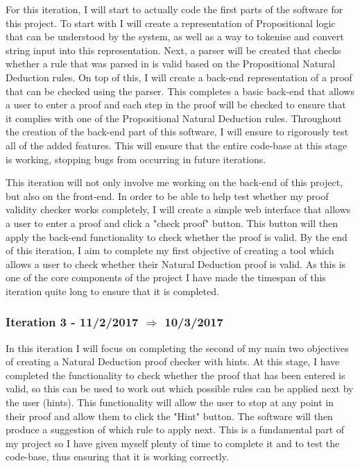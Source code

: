 For this iteration, I will start to actually code the first parts of the software for this project. To start with I will create a representation of Propositional logic that can be understood by the system, as well as a way to tokenise and convert string input into this representation. Next, a parser will be created that checks whether a rule that was parsed in is valid based on the Propositional Natural Deduction rules. On top of this, I will create a back-end representation of a proof that can be checked using the parser. This completes a basic back-end that allows a user to enter a proof and each step in the proof will be checked to ensure that it complies with one of the Propositional Natural Deduction rules. Throughout the creation of the back-end part of this software, I will ensure to rigorously test all of the added features. This will ensure that the entire code-base at this stage is working, stopping bugs from occurring in future iterations. 

This iteration will not only involve me working on the back-end of this project, but also on the front-end. In order to be able to help test whether my proof validity checker works completely, I will create a simple web interface that allows a user to enter a proof and click a "check proof" button. This button will then apply the back-end functionality to check whether the proof is valid. By the end of this iteration, I aim to complete my first objective of creating a tool which allows a user to check whether their Natural Deduction proof is valid. As this is one of the core components of the project I have made the timespan of this iteration quite long to ensure that it is completed.

\subsubsection{Iteration 3 - 11/2/2017 $\Rightarrow$ 10/3/2017}

In this iteration I will focus on completing the second of my main two objectives of creating a Natural Deduction proof checker with hints. At this stage, I have completed the functionality to check whether the proof that has been entered is valid, so this can be used to work out which possible rules can be applied next by the user (hints). This functionality will allow the user to stop at any point in their proof and allow them to click the "Hint" button. The software will then produce a suggestion of which rule to apply next. This is a fundamental part of my project so I have given myself plenty of time to complete it and to test the code-base, thus ensuring that it is working correctly.

